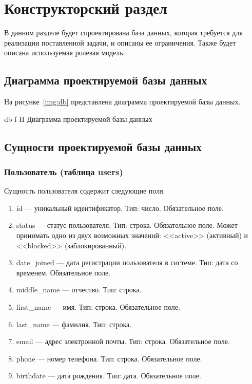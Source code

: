 \chapter{Конструкторский раздел}

В данном разделе будет спроектирована база данных, которая требуется для реализации поставленной задачи, и описаны ее ограничения. Также будет описана используемая ролевая модель.

\section{Диаграмма проектируемой базы данных}

На рисунке~\ref{img:db} представлена диаграмма проектируемой базы данных.

    {db}
    {f}
    {H}
    {\textwidth}
    {Диаграмма проектируемой базы данных}

\section{Сущности проектируемой базы данных}

\subsection{Пользователь (таблица users)}

Сущность пользователя содержит следующие поля.

\begin{enumerate}
    \item id --- уникальный идентификатор. Тип: число. Обязательное поле.
    \item status --- статус пользователя. Тип: строка. Обязательное поле. Может принимать одно из двух возможных значений: <<active>> (активный) и <<blocked>> (заблокированный).
    \item date\_joined --- дата регистрации пользователя в системе. Тип: дата со временем. Обязательное поле.
    \item middle\_name --- отчество. Тип: строка.
    \item first\_name --- имя. Тип: строка. Обязательное поле.
    \item last\_name --- фамилия. Тип: строка.
    \item email --- адрес электронной почты. Тип: строка. Обязательное поле.
    \item phone --- номер телефона. Тип: строка. Обязательное поле.
    \item birthdate --- дата рождения. Тип: дата. Обязательное поле.
\end{enumerate}

